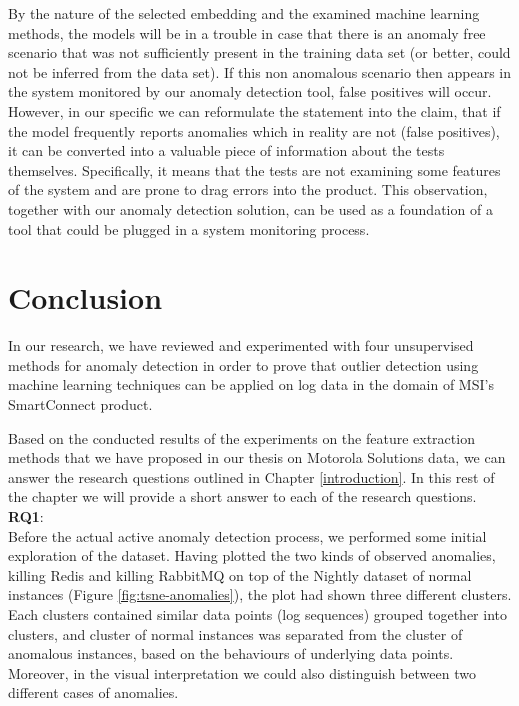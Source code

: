 By the nature of the selected embedding and the examined machine learning methods, the models will be in a trouble in case that there is an anomaly free scenario that was not sufficiently present in the training data set (or better, could not be inferred from the data set). If this non anomalous scenario then appears in the system monitored by our anomaly detection tool,  false positives will occur.\\
However, in our specific we can reformulate the statement into the claim, that if the model frequently reports anomalies which in reality are not (false positives), it can be converted into  a valuable piece of information about the tests themselves. 
Specifically, it means that the tests are not examining some features of the system and are prone to drag errors into the product. 
This observation, together with our anomaly detection solution, can be used as a foundation of a tool that could be plugged in a system monitoring process.
\section{Conclusion}

In our research, we have reviewed and experimented with four unsupervised methods for anomaly detection in order to prove that outlier detection using machine learning techniques can be applied on log data in the domain of MSI's SmartConnect product.

Based on the conducted results of the experiments on the feature extraction methods that we have proposed in our thesis on Motorola Solutions data, we can answer the research questions outlined in Chapter \ref{introduction}. In this rest of the chapter we will provide a short answer to each of the research questions. \\

\textbf{RQ1}: \textit{\RQFirst}\\

Before the actual active anomaly detection process, we performed some initial exploration of the dataset. Having plotted the two kinds of observed anomalies, killing Redis and killing RabbitMQ on top of the Nightly dataset of normal instances (Figure \ref{fig:tsne-anomalies}), the plot had shown three different clusters. Each clusters contained similar data points (log sequences) grouped together into clusters, and cluster of normal instances was separated from the cluster of anomalous instances, based on the behaviours of underlying data points. Moreover, in the visual interpretation we could also distinguish between two different cases of anomalies.

